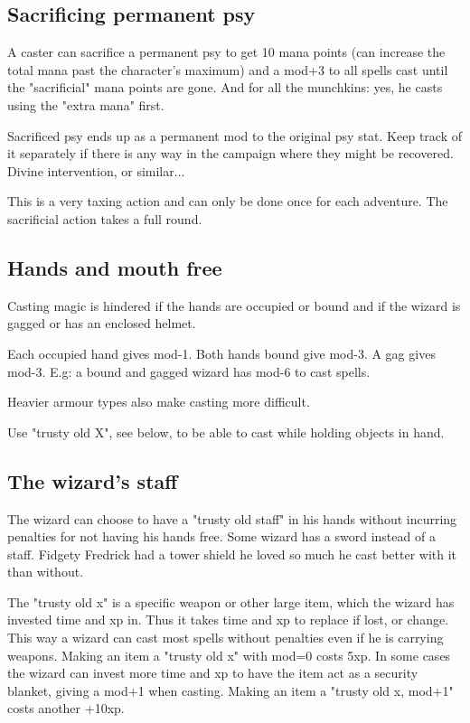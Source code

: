 \subsection*{Sacrificing permanent psy}
A caster can sacrifice a permanent psy to get 10 mana points (can increase the total mana past the character's maximum) and a mod+3 to all spells cast until the "sacrificial" mana points are gone. And for all the munchkins: yes, he casts using the "extra mana" first.

Sacrificed psy ends up as a permanent mod to the original psy stat. Keep track of it separately if there is any way in the campaign where they might be recovered. Divine intervention, or similar...

This is a very taxing action and can only be done once for each adventure. The sacrificial action takes a full round.


\subsection*{Hands and mouth free}
Casting magic is hindered if the hands are occupied or bound and if the wizard is gagged or has an enclosed helmet.

Each occupied hand gives mod-1. Both hands bound give mod-3. A gag gives mod-3.
E.g: a bound and gagged wizard has mod-6 to cast spells.

Heavier armour types also make casting more difficult.

Use "trusty old X", see below, to be able to cast while holding objects in hand.


\subsection*{The wizard's staff}
The wizard can choose to have a "trusty old staff" in his hands without incurring penalties for not having his hands free. Some wizard has a sword instead of a staff. Fidgety Fredrick had a tower shield he loved so much he cast better with it than without.

The "trusty old x" is a specific weapon or other large item, which the wizard has invested time and xp in. Thus it takes time and xp to replace if lost, or change. This way a wizard can cast most spells without penalties even if he is carrying weapons. Making an item a "trusty old x" with mod=0 costs 5xp.
In some cases the wizard can invest more time and xp to have the item act as a security blanket, giving a mod+1 when casting. Making an item a "trusty old x, mod+1" costs another +10xp.

